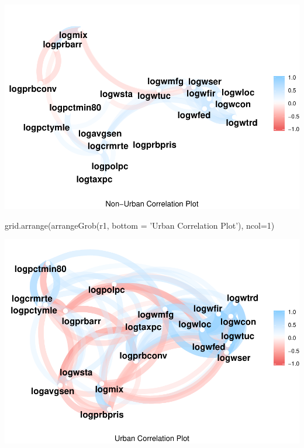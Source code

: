\documentclass[]{article}
\newenvironment{Shaded}{}{}
\newcommand{\DataTypeTok}[1]{#1}
\newcommand{\DecValTok}[1]{#1}
\newcommand{\KeywordTok}[1]{\textcolor[rgb]{0.00,0.00,1.00}{#1}}
\newcommand{\NormalTok}[1]{#1}
\newcommand{\StringTok}[1]{\textcolor[rgb]{0.00,0.50,0.50}{#1}}
\begin{document}
\includegraphics{Bagnard_Gaustad_Hartman_Leung_Lab_3_files/figure-latex/unnamed-chunk-103-4.pdf}

\begin{Shaded}
\begin{Highlighting}[]
\KeywordTok{grid.arrange}\NormalTok{(}\KeywordTok{arrangeGrob}\NormalTok{(r1, }\DataTypeTok{bottom =} \StringTok{'Urban Correlation Plot'}\NormalTok{), }\DataTypeTok{ncol=}\DecValTok{1}\NormalTok{)}
\end{Highlighting}
\end{Shaded}

\includegraphics{Bagnard_Gaustad_Hartman_Leung_Lab_3_files/figure-latex/unnamed-chunk-103-5.pdf}
\end{document}
